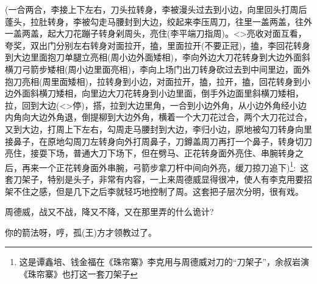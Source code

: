 {({\hwl 一合两合}，李{\hwl 接上下左右}，{\hwl 刀头拉转身}，李{\hwl 被漫头过去到小边}，{\hwl 向里回头打}周{\hwl 后蓬头}，{\hwl 拉肚转身}，李{\hwl 被勾走马腰封到大边}，{\hwl 绞起来}李{\hwfs 压}周{\hwfs 刀}，{\hwl 往里一盖两盖}，{\hwl 往外一盖两盖}，{\hwl 起大刀花蹦子转身剁}周{\hwfs 头}，{\hwl 亮住}(李{\hwfs 平端刀指}周)。\textless{}\!\textgreater{}{\hwl 亮收对面互看}，{\hwl 夸奖}，{\hwl 双出门分别左右转身对面拉开}，{\hwfs 搕}，{\hwl 里面拉开}({\hwfs 不要正冠})，{\hwfs 搕}，李{\hwl 回花转身到大边里面抱刀单腿立亮相}(周{\hwfs 小边外面矮相})，李{\hwl 向外边大刀花转身到大边外面斜横刀弓箭步矮相}(周{\hwfs 小边里面亮相})，李{\hwl 向上场门出刀转身砍过去到中间里边}，{\hwl 面外抱刀亮相}(周{\hwfs 里面矮相})，{\hwl 拉转身到小边}，{\hwl 对面拉开}，{\hwfs 搕}，{\hwl 拉开}，{\hwfs 搕}，{\hwl 回花转身到小边外面斜横刀矮相}，{\hwl 向里边大刀花转身到小边里面}，{\hwl 倒手外边面里斜横刀矮相}，{\hwl 拉}，{\hwl 回到大边}(\textless{}\!\textgreater{}{\hwfs 停})，{\hwl 搭}，{\hwl 拉到大边里角}，{\hwl 一合到小边外角}，{\hwl 从小边外角经小边内角向大边外角退}，{\hwl 倒提柳到大边外角}，{\hwl 横着一个大刀花过合}，{\hwl 两个大刀花过合}，{\hwl 又到大边}，{\hwl 打}周{\hwl 上下左右}，{\hwl 勾}周{\hwl 走马腰封到大边}，李{\hwl 归小边}，{\hwl 原地被勾刀转身向里接鼻子}，{\hwl 在原地勾周刀左转身向外打}周{\hwl 鼻子}，{\hwl 刀鐏盖}周{\hwl 刀再打一个鼻子}，{\hwl 转身切刀亮住}，{\hwl 接耍下场}，{\hwl 普通大刀下场下}，{\hwl 但在劈马}、{\hwl 正花转身面外亮住}、{\hwl 串腕转身之后}，{\hwl 再来一个正花转身面外串腕}，{\hwl 弓箭步拿刀杆中间向外亮}，{\hwl 缓刀掠刀追下})\footnote{\hei 这是谭鑫培、钱金福在《珠帘寨》李克用与周德威对刀的``刀架子''，余叔岩演《珠帘寨》也打这一套刀架子}:~这套刀架子，特别是头子，非常有内容，{\hei 一上来周德威显得很冲，使人有李克用要招架不住之感，但是几下之后李就轻巧地控制了周。这套把子层次分明，很有戏。}






周德威，战又不战，降又不降，又在那里弄的什么诡计?

你的箭法呀，哼，孤(王)方才领教过了。

}
